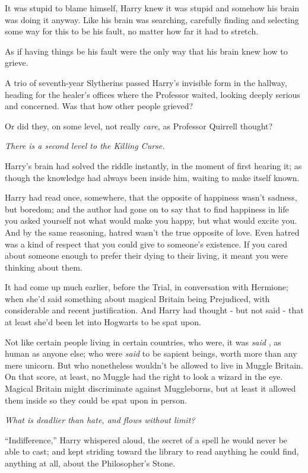 It was stupid to blame himself, Harry knew it was stupid and somehow his
brain was doing it anyway. Like his brain was searching, carefully
finding and selecting some way for this to be his fault, no matter how
far it had to stretch.

As if having things be his fault were the only way that his brain knew
how to grieve.

A trio of seventh-year Slytherins passed Harry's invisible form in the
hallway, heading for the healer's offices where the Professor waited,
looking deeply serious and concerned. Was that how other people grieved?

Or did they, on some level, not really \emph{care,} as Professor
Quirrell thought?

\emph{There is a second level to the Killing Curse.}

Harry's brain had solved the riddle instantly, in the moment of first
hearing it; as though the knowledge had always been inside him, waiting
to make itself known.

Harry had read once, somewhere, that the opposite of happiness wasn't
sadness, but boredom; and the author had gone on to say that to find
happiness in life you asked yourself not what would make you happy, but
what would excite you. And by the same reasoning, hatred wasn't the true
opposite of love. Even hatred was a kind of respect that you could give
to someone's existence. If you cared about someone enough to prefer
their dying to their living, it meant you were thinking about them.

It had come up much earlier, before the Trial, in conversation with
Hermione; when she'd said something about magical Britain being
Prejudiced, with considerable and recent justification. And Harry had
thought - but not said - that at least she'd been let into Hogwarts to
be spat upon.

Not like certain people living in certain countries, who were, it was
\emph{said} , as human as anyone else; who were \emph{said} to be
sapient beings, worth more than any mere unicorn. But who nonetheless
wouldn't be allowed to live in Muggle Britain. On that score, at least,
no Muggle had the right to look a wizard in the eye. Magical Britain
might discriminate against Muggleborns, but at least it allowed them
inside so they could be spat upon in person.

\emph{What is deadlier than hate, and flows without limit?}

``Indifference,'' Harry whispered aloud, the secret of a spell he would
never be able to cast; and kept striding toward the library to read
anything he could find, anything at all, about the Philosopher's Stone.
